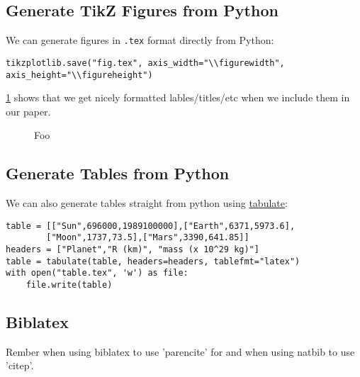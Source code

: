 \documentclass{article}
\newlength{\figurewidth}
\newlength{\figureheight}
\begin{document}
\subsection{Generate TikZ Figures from Python}
We can generate figures in \texttt{.tex} format directly from Python:
\begin{verbatim}
tikzplotlib.save("fig.tex", axis_width="\\figurewidth", axis_height="\\figureheight")
\end{verbatim}
\cref{fig:example} shows that we get nicely formatted lables/titles/etc when we include them in our paper.
\begin{figure}[h]
    \centering\footnotesize

    \setlength{\figurewidth}{.33\textwidth}
    \setlength{\figureheight}{.75\figurewidth}


    \begin{subfigure}{.4\textwidth}
        \centering
        
    \end{subfigure}
    \hfill
    \begin{subfigure}{.4\textwidth}
        \centering
        
    \end{subfigure}
    \caption{Foo}
    \label{fig:example}
\end{figure}

\subsection{Generate Tables from Python}
We can also generate tables straight from python using \href{https://github.com/astanin/python-tabulate}{tabulate}:
\begin{verbatim}
table = [["Sun",696000,1989100000],["Earth",6371,5973.6],
        ["Moon",1737,73.5],["Mars",3390,641.85]]
headers = ["Planet","R (km)", "mass (x 10^29 kg)"]
table = tabulate(table, headers=headers, tablefmt="latex")
with open("table.tex", 'w') as file:
    file.write(table)
\end{verbatim}

\begin{table}[h]
    \centering
    
\end{table}

\subsection{Biblatex}
Rember when using biblatex to use 'parencite' for \parencite{kamtheDataEfficient2018} and when using natbib to use 'citep'.
\end{document}
